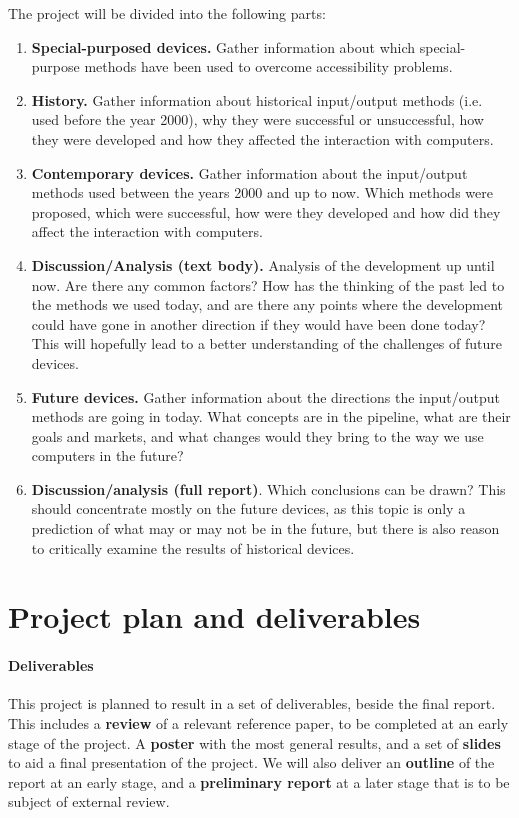 \documentclass[a4paper,10pt]{article}
\begin{document}
The project will be divided into the following parts:
\begin{enumerate}
	\item \textbf{Special-purposed devices.} Gather information about which special-purpose methods have been used to overcome accessibility problems.
	\item \textbf{History.} Gather information about historical input/output methods (i.e. used before the year 2000), why they were successful or unsuccessful, how they were developed and how they affected the interaction with computers.
	\item \textbf{Contemporary devices.} Gather information about the input/output methods used between the years 2000 and up to now. Which methods were proposed, which were successful, how were they developed and how did they affect the interaction with computers.
	\item \textbf{Discussion/Analysis (text body).} Analysis of the development up until now. Are there any common factors? How has the thinking of the past led to the methods we used today, and are there any points where the development could have gone in another direction if they would have been done today? This will hopefully lead to a better understanding of the challenges of future devices.
	\item \textbf{Future devices.} Gather information about the directions the input/output methods are going in today. What concepts are in the pipeline, what are their goals and markets, and what changes would they bring to the way we use computers in the future?
	\item \textbf{Discussion/analysis (full report)}. Which conclusions can be drawn? This should concentrate mostly on the future devices, as this topic is only a prediction of what may or may not be in the future, but there is also reason to critically examine the results of historical devices.

\end{enumerate}

\section{Project plan and deliverables}
\paragraph{Deliverables}
This project is planned to result in a set of deliverables, beside the final report. This includes a \textbf{review} of a relevant reference paper, to be completed at an early stage of the project. A \textbf{poster} with the most general results, and a set of \textbf{slides} to aid a final presentation of the project. We will also deliver an \textbf{outline} of the report at an early stage, and a \textbf{preliminary report} at a later stage that is to be subject of external review.
\end{document}
